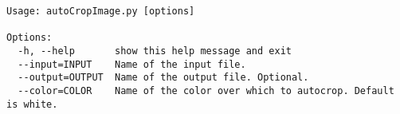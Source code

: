 \begin{verbatim}
Usage: autoCropImage.py [options]

Options:
  -h, --help       show this help message and exit
  --input=INPUT    Name of the input file.
  --output=OUTPUT  Name of the output file. Optional.
  --color=COLOR    Name of the color over which to autocrop. Default is white.
\end{verbatim}